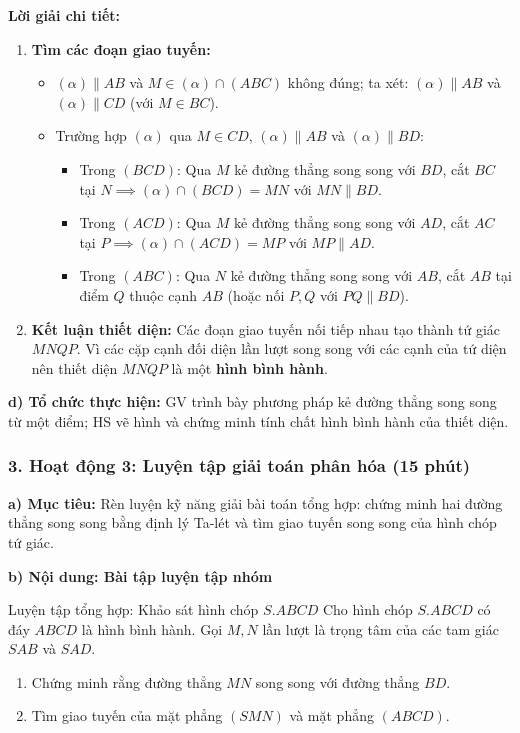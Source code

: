 \documentclass[12pt, a4paper]{article}
\begin{document}
\textbf{Lời giải chi tiết:}
\begin{enumerate}[leftmargin=0.6cm]
    \item \textbf{Tìm các đoạn giao tuyến:}
    \begin{itemize}
        \item $(\alpha) \parallel AB$ và $M \in (\alpha) \cap (ABC)$ không đúng; ta xét: $(\alpha) \parallel AB$ và $(\alpha) \parallel CD$ (với $M \in BC$).
        \item Trường hợp $(\alpha)$ qua $M \in CD$, $(\alpha) \parallel AB$ và $(\alpha) \parallel BD$:
        \begin{itemize}
            \item Trong $(BCD)$: Qua $M$ kẻ đường thẳng song song với $BD$, cắt $BC$ tại $N \implies (\alpha) \cap (BCD) = MN$ với $MN \parallel BD$.
            \item Trong $(ACD)$: Qua $M$ kẻ đường thẳng song song với $AD$, cắt $AC$ tại $P \implies (\alpha) \cap (ACD) = MP$ với $MP \parallel AD$.
            \item Trong $(ABC)$: Qua $N$ kẻ đường thẳng song song với $AB$, cắt $AB$ tại điểm $Q$ thuộc cạnh $AB$ (hoặc nối $P, Q$ với $PQ \parallel BD$).
        \end{itemize}
    \end{itemize}
    \item \textbf{Kết luận thiết diện:}
    Các đoạn giao tuyến nối tiếp nhau tạo thành tứ giác $MNQP$. Vì các cặp cạnh đối diện lần lượt song song với các cạnh của tứ diện nên thiết diện $MNQP$ là một \textbf{hình bình hành}.
\end{enumerate}

\noindent \textbf{d) Tổ chức thực hiện:}
GV trình bày phương pháp kẻ đường thẳng song song từ một điểm; HS vẽ hình và chứng minh tính chất hình bình hành của thiết diện.

\subsubsection*{3. Hoạt động 3: Luyện tập giải toán phân hóa (15 phút)}

\noindent \textbf{a) Mục tiêu:}
Rèn luyện kỹ năng giải bài toán tổng hợp: chứng minh hai đường thẳng song song bằng định lý Ta-lét và tìm giao tuyến song song của hình chóp tứ giác.

\noindent \textbf{b) Nội dung: Bài tập luyện tập nhóm}
\begin{pedabox}{Luyện tập tổng hợp: Khảo sát hình chóp $S.ABCD$}
Cho hình chóp $S.ABCD$ có đáy $ABCD$ là hình bình hành. Gọi $M, N$ lần lượt là trọng tâm của các tam giác $SAB$ và $SAD$.
\begin{enumerate}[leftmargin=0.6cm]
    \item Chứng minh rằng đường thẳng $MN$ song song với đường thẳng $BD$.
    \item Tìm giao tuyến của mặt phẳng $(SMN)$ và mặt phẳng $(ABCD)$.
\end{enumerate}
\end{pedabox}
\end{document}

